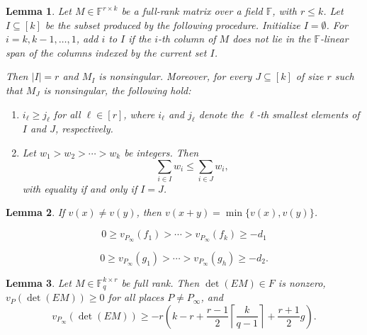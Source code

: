 \documentclass[10pt,a4paper]{amsart}
\newtheorem{lemma}{Lemma}
\newcommand{\F}{\mathbb{F}}
\begin{document}
\begin{lemma}\label{lem:unique}
Let $M \in \F^{r \times k}$ be a full-rank matrix over a field $\F$, with $r \le k$. 
Let $I \subseteq [k]$ be the subset produced by the following procedure.
Initialize $I = \emptyset$. For $i = k, k-1, \dots, 1$, add $i$ to $I$ if the $i$-th column of $M$ does not lie in the $\F$-linear span of the columns indexed by the current set $I$.

Then $|I| = r$ and $M_I$ is nonsingular. Moreover, for every $J \subseteq [k]$ of size $r$ such that $M_J$ is nonsingular, the following hold:
\begin{enumerate}
\item $i_\ell \ge j_\ell$ for all $\ell \in [r]$, where $i_\ell$ and $j_\ell$ denote the $\ell$-th smallest elements of $I$ and $J$, respectively.
\item Let $w_1 > w_2 > \cdots > w_k$ be integers. Then
\[
\sum_{i \in I} w_i \le \sum_{i \in J} w_i,
\]
with equality if and only if $I = J$.
\end{enumerate}
\end{lemma}

\begin{lemma}\label{lem:triangle}
If $v(x)\neq v(y)$, then $v(x+y)=\min\{v(x),v(y)\}$.
\end{lemma}

\begin{equation}\label{eq:dec-ord-1}
0\geq v_{P_\infty}(f_1) > \cdots > v_{P_\infty}(f_k) \geq -d_1
\end{equation}

\begin{equation}\label{eq:dec-ord-2}
0\geq v_{P_\infty}(g_1) > \cdots > v_{P_\infty}(g_h) \geq -d_2.
\end{equation}

\begin{lemma}\label{lem:FS-deg}
Let $M\in \mathbb{F}_q^{k\times r}$ be full rank. Then $\det(EM)\in F$ is nonzero, $v_P(\det(EM))\geq 0$ for all places $P\neq P_\infty$, and 
\[
v_{P_\infty}(\det(EM))\geq -r\left(
k-r+\frac{r-1}{2}\left\lceil \frac{k}{q-1}\right\rceil+\frac{r+1}{2}g 
\right).
\]
\end{lemma}
\end{document}
